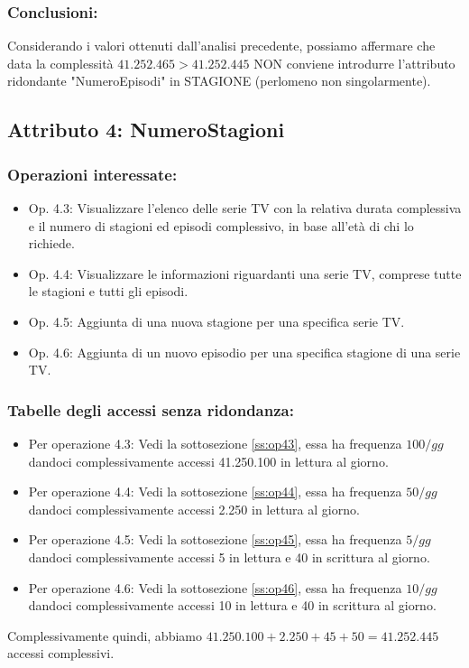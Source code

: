 \documentclass[a4paper,12pt]{report}
\begin{document}
\subsubsection{Conclusioni:}
Considerando i valori ottenuti dall'analisi precedente, possiamo affermare che data la complessità $41.252.465 > 41.252.445$ NON conviene introdurre l'attributo ridondante "NumeroEpisodi" in STAGIONE (perlomeno non singolarmente).


\subsection{Attributo 4: NumeroStagioni}
\subsubsection{Operazioni interessate:}
\begin{itemize}
	\item Op. 4.3: Visualizzare l’elenco delle serie TV con la relativa durata complessiva e il numero di stagioni ed episodi complessivo, in base all’età di chi lo richiede.
	\item Op. 4.4: Visualizzare le informazioni riguardanti una serie TV, comprese tutte le stagioni e tutti gli episodi.
	\item Op. 4.5: Aggiunta di una nuova stagione per una specifica serie TV.
	\item Op. 4.6: Aggiunta di un nuovo episodio per una specifica stagione di una serie TV.
\end{itemize}
\subsubsection{Tabelle degli accessi senza ridondanza:}
\begin{itemize}
	\item Per operazione 4.3: Vedi la sottosezione \ref{ss:op43}, essa ha frequenza $100/gg$ dandoci complessivamente accessi 41.250.100 in lettura al giorno.
	\item Per operazione 4.4: Vedi la sottosezione \ref{ss:op44}, essa ha frequenza $50/gg$ dandoci complessivamente accessi 2.250 in lettura al giorno.
	\item Per operazione 4.5: Vedi la sottosezione \ref{ss:op45}, essa ha frequenza $5/gg$ dandoci complessivamente accessi 5 in lettura e 40 in scrittura al giorno.
	\item Per operazione 4.6: Vedi la sottosezione \ref{ss:op46}, essa ha frequenza $10/gg$ dandoci complessivamente accessi 10 in lettura e 40 in scrittura al giorno.
\end{itemize}
Complessivamente quindi, abbiamo $ 41.250.100 + 2.250 + 45 + 50 = 41.252.445$ accessi complessivi.
\end{document}
